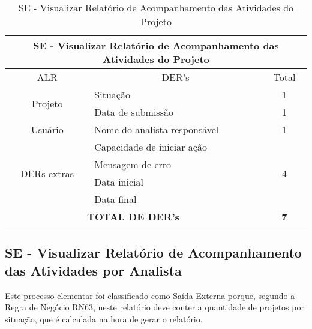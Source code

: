       \begin{table}[!h]
      \centering
      \caption{SE - Visualizar Relatório de Acompanhamento das Atividades do Projeto}
      \label{se_visualizar_relatorio_acompanhamento}
      \begin{tabular}{|c|l|c|}
      \hline
      \multicolumn{3}{|c|}{SE - Visualizar Relatório de Acompanhamento das Atividades do Projeto} \\ \hline
      ALR                              & \multicolumn{1}{c|}{DER's}       & Total                 \\ \hline
      \multirow{2}{*}{Projeto}         & Situação                         & 1                     \\ \cline{2-3} 
				      & Data de submissão                & 1                     \\ \hline
      Usuário                          & Nome do analista responsável     & 1                     \\ \hline
      \multirow{4}{*}{DERs extras}     & Capacidade de iniciar ação       & \multirow{4}{*}{4}    \\ \cline{2-2}
				      & Mensagem de erro                 &                       \\ \cline{2-2}
				      & Data inicial                     &                       \\ \cline{2-2}
				      & Data final                       &                       \\ \hline
      \multicolumn{2}{|c|}{\textbf{TOTAL DE DER's}}                       & \textbf{7}            \\ \hline
      \end{tabular}
      \end{table}
      
  \subsection{SE - Visualizar Relatório de Acompanhamento das Atividades por Analista}
      
      Este processo elementar foi classificado como Saída Externa porque, segundo a Regra de Negócio RN63, neste relatório
    deve conter a quantidade de projetos por situação, que é calculada na hora de gerar o relatório.
      

